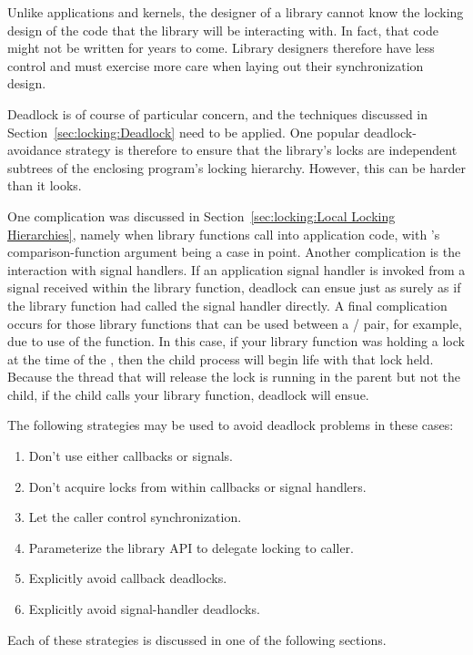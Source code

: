 Unlike applications and kernels, the designer of a library cannot
know the locking design of the code that the library will be interacting
with.
In fact, that code might not be written for years to come.
Library designers therefore have less control and must exercise more
care when laying out their synchronization design.

Deadlock is of course of particular concern, and the techniques discussed
in Section~\ref{sec:locking:Deadlock} need to be applied.
One popular deadlock-avoidance strategy is therefore to ensure that
the library's locks are independent subtrees of the enclosing program's
locking hierarchy.
However, this can be harder than it looks.

One complication was discussed in
Section~\ref{sec:locking:Local Locking Hierarchies}, namely
when library functions call into application code, with 's
comparison-function argument being a case in point.
Another complication is the interaction with signal handlers.
If an application signal handler is invoked from a signal received within
the library function, deadlock can ensue just as surely as
if the library function had called the signal handler directly.
A final complication occurs for those library functions that can be used
between a / pair, for example, due to use of
the  function.
In this case, if your library function was holding a lock at the time of
the , then the child process will begin life with that lock held.
Because the thread that will release the lock is running in the parent
but not the child, if the child calls your library function, deadlock
will ensue.

The following strategies may be used to avoid deadlock problems in these cases:

\begin{enumerate}
\item	Don't use either callbacks or signals.
\item	Don't acquire locks from within callbacks or signal handlers.
\item	Let the caller control synchronization.
\item	Parameterize the library API to delegate locking to caller.
\item	Explicitly avoid callback deadlocks.
\item	Explicitly avoid signal-handler deadlocks.
\end{enumerate}

Each of these strategies is discussed in one of the following sections.

